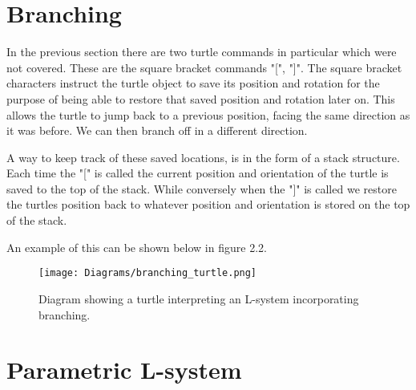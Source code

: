 \section{Branching} \label{branching}

\begin{flushleft}

In the previous section there are two turtle commands in particular which were  not covered. These are the square bracket commands "[", "]". The square bracket characters instruct the turtle object to save its position and rotation for the purpose of being able to restore that saved position and rotation later on. This allows the turtle to jump back to a previous position, facing the same direction as it was before. We can then branch off in a different direction.\\

\vspace{5mm}

A way to keep track of these saved locations, is in the form of a stack structure. Each time the "[" is called the current position and orientation of the turtle is saved to the top of the stack. While conversely when the "]" is called we restore the turtles position back to whatever position and orientation is stored on the top of the stack. \\

\vspace{5mm}

An example of this can be shown below in figure 2.2.\\

\begin{figure}[htbp]
	{\centering
		\vspace{7px}
		\texttt{[image: Diagrams/branching\_turtle.png]}
		\caption{Diagram showing a turtle interpreting an L-system incorporating branching.}
	}
\end{figure}
\FloatBarrier

\end{flushleft}

\section{Parametric L-system} \label{parametric}

